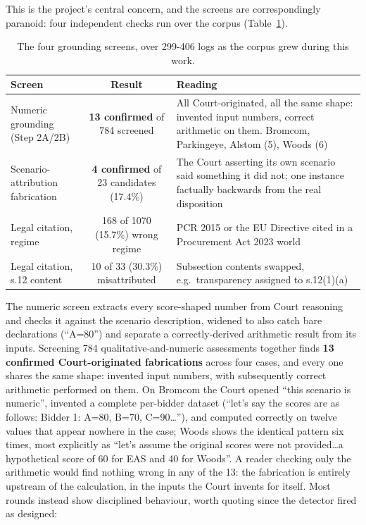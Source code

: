 This is the project's central concern, and the screens are correspondingly
paranoid: four independent checks run over the corpus
(Table~\ref{tab:fabrication}).

\begin{table}[htbp]
\centering
\footnotesize
\caption[Fabrication screens]{The four grounding screens, over 299-406 logs
as the corpus grew during this work.}
\label{tab:fabrication}
\begin{tabularx}{\textwidth}{@{}>{\raggedright\arraybackslash}p{3.6cm}cX@{}}
\toprule
\textbf{Screen} & \textbf{Result} & \textbf{Reading} \\
\midrule
Numeric grounding (Step 2A/2B) & \textbf{13 confirmed} of 784 screened &
 All Court-originated, all the same shape: invented input numbers, correct
 arithmetic on them. Bromcom, Parkingeye, Alstom (5), Woods (6) \\
Scenario-attribution fabrication & \textbf{4 confirmed} of 23 candidates
 (17.4\%) & The Court asserting its own scenario said something it did not;
 one instance factually backwards from the real disposition \\
Legal citation, regime & 168 of 1070 (15.7\%) wrong regime &
 PCR 2015 or the EU Directive cited in a Procurement Act 2023 world \\
Legal citation, s.12 content & 10 of 33 (30.3\%) misattributed &
 Subsection contents swapped, e.g.\ transparency assigned to s.12(1)(a) \\
\bottomrule
\end{tabularx}
\end{table}

The numeric screen extracts every score-shaped number from Court reasoning
and checks it against the scenario description, widened to also catch bare
declarations (``A=80'') and separate a correctly-derived arithmetic result
from its inputs. Screening 784
qualitative-and-numeric assessments together finds \textbf{13 confirmed
Court-originated fabrications} across four cases, and every one shares the
same shape: invented input numbers, with subsequently correct arithmetic
performed on them. On Bromcom the Court opened ``this scenario is
numeric'', invented a complete per-bidder dataset (``let's say the scores
are as follows: Bidder 1: A=80, B=70, C=90\ldots''), and computed correctly
on twelve values that appear nowhere in the case; Woods shows the identical
pattern six times, most explicitly as ``let's assume the original scores
were not provided\ldots a hypothetical score of 60 for EAS and 40 for
Woods''. A reader checking only the arithmetic would find nothing wrong in
any of the 13: the fabrication is entirely upstream of the calculation, in
the inputs the Court invents for itself. Most rounds instead show
disciplined behaviour, worth quoting since the detector fired as designed:

